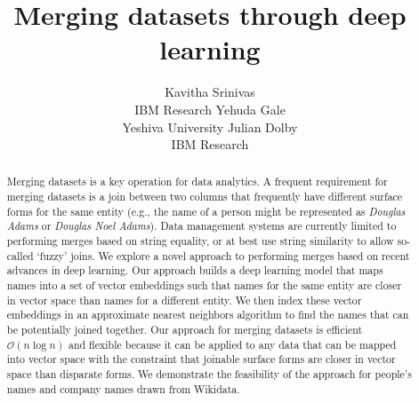 \documentclass[letterpaper]{article} %
\begin{document}
%
\title{Merging datasets through deep learning}


\author{Kavitha Srinivas \\ IBM Research
\And Yehuda Gale \\ Yeshiva University
\And Julian Dolby \\ IBM Research}


\maketitle
\begin{abstract}
Merging datasets is a key operation for data analytics.  A frequent requirement for merging datasets is a join between two columns that frequently have different surface forms for the same entity (e.g., the name of a person might be represented as \textit{Douglas Adams} or \textit{Douglas Noel Adams}).  Data management systems are currently limited to performing merges based on string equality, or at best use string similarity to allow so-called `fuzzy' joins.  We explore a novel approach to performing merges based on recent advances in deep learning.  Our approach builds a deep learning model that maps names into a set of vector embeddings such that names for the same entity are closer in vector space than names for a different entity.  We then index these vector embeddings in an approximate nearest neighbors algorithm to find the names that can be potentially joined together.  Our approach for merging datasets is efficient $\mathcal{O}(n\log{}n)$ and flexible because it can be applied to any data that can be mapped into vector space with the constraint that joinable surface forms are closer in vector space than disparate forms.  We demonstrate the feasibility of the approach for people's names and company names drawn from Wikidata.
\end{abstract}






  
  
  
\end{document}
